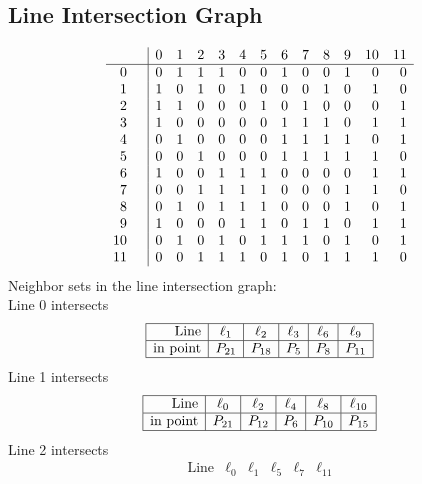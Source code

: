 \documentclass{article}
\begin{document}
{\subsection*{Line Intersection Graph}
{\arraycolsep=1pt
$$
\begin{array}{rr|*{12}r}
 &  & 0 & 1 & 2 & 3 & 4 & 5 & 6 & 7 & 8 & 9 & 10 & 11\\
\hline
0 &  & 0 & 1 & 1 & 1 & 0 & 0 & 1 & 0 & 0 & 1 & 0 & 0\\
1 &  & 1 & 0 & 1 & 0 & 1 & 0 & 0 & 0 & 1 & 0 & 1 & 0\\
2 &  & 1 & 1 & 0 & 0 & 0 & 1 & 0 & 1 & 0 & 0 & 0 & 1\\
3 &  & 1 & 0 & 0 & 0 & 0 & 0 & 1 & 1 & 1 & 0 & 1 & 1\\
4 &  & 0 & 1 & 0 & 0 & 0 & 0 & 1 & 1 & 1 & 1 & 0 & 1\\
5 &  & 0 & 0 & 1 & 0 & 0 & 0 & 1 & 1 & 1 & 1 & 1 & 0\\
6 &  & 1 & 0 & 0 & 1 & 1 & 1 & 0 & 0 & 0 & 0 & 1 & 1\\
7 &  & 0 & 0 & 1 & 1 & 1 & 1 & 0 & 0 & 0 & 1 & 1 & 0\\
8 &  & 0 & 1 & 0 & 1 & 1 & 1 & 0 & 0 & 0 & 1 & 0 & 1\\
9 &  & 1 & 0 & 0 & 0 & 1 & 1 & 0 & 1 & 1 & 0 & 1 & 1\\
10 &  & 0 & 1 & 0 & 1 & 0 & 1 & 1 & 1 & 0 & 1 & 0 & 1\\
11 &  & 0 & 0 & 1 & 1 & 1 & 0 & 1 & 0 & 1 & 1 & 1 & 0\\
\end{array}
$$
}%
Neighbor sets in the line intersection graph:\\
Line 0 intersects 
$$
\begin{array}{|r*{5}{|c}|}
\hline
\mbox{Line}  & \ell_{1} & \ell_{2} & \ell_{3} & \ell_{6} & \ell_{9}\\
\hline
\mbox{in point}  & P_{21} & P_{18} & P_{5} & P_{8} & P_{11}\\
\hline
\end{array}
$$
Line 1 intersects 
$$
\begin{array}{|r*{5}{|c}|}
\hline
\mbox{Line}  & \ell_{0} & \ell_{2} & \ell_{4} & \ell_{8} & \ell_{10}\\
\hline
\mbox{in point}  & P_{21} & P_{12} & P_{6} & P_{10} & P_{15}\\
\hline
\end{array}
$$
Line 2 intersects 
$$
\begin{array}{|r*{5}{|c}|}
\hline
\mbox{Line}  & \ell_{0} & \ell_{1} & \ell_{5} & \ell_{7} & \ell_{11}\\

\end{array}$$}
\end{document}
